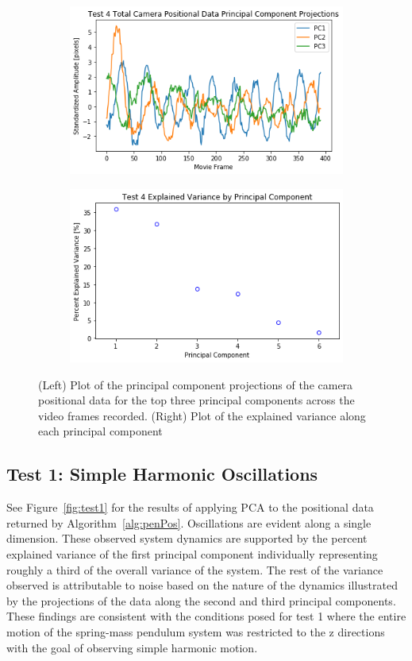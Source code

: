 \documentclass{article}
\begin{document}
\begin{figure}
\centering
   \begin{subfigure}{0.49\linewidth} \centering
     \includegraphics[scale=0.5]{T4_pcDynamics.png}
   \end{subfigure}
   \begin{subfigure}{0.49\linewidth} \centering
     \includegraphics[scale=0.5]{T4_pcExplainedVariance.png}
   \end{subfigure}
\caption{(Left) Plot of the principal component projections of the camera positional data for the top three principal components across the video frames recorded. (Right) Plot of the explained variance along each principal component} \label{fig:test4}
\end{figure}

\subsection{Test 1: Simple Harmonic Oscillations}
See Figure~\ref{fig:test1} for the results of applying PCA to the positional data returned by Algorithm~\ref{alg:penPos}. Oscillations are evident along a single dimension. These observed system dynamics are supported by the percent explained variance of the first principal component individually representing roughly a third of the overall variance of the system. The rest of the variance observed is attributable to noise based on the nature of the dynamics illustrated by the projections of the data along the second and third principal components. These findings are consistent with the conditions posed for test 1 where the entire motion of the spring-mass pendulum system was restricted to the z directions with the goal of observing simple harmonic motion.
\end{document}
